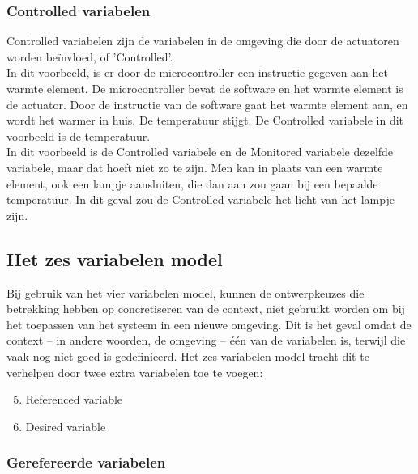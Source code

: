 \documentclass{article}
\begin{document}
			\subsubsection{Controlled variabelen}

			Controlled variabelen zijn de variabelen in de omgeving die door de actuatoren worden beïnvloed, of 'Controlled'. \\
			In dit voorbeeld, is er door de microcontroller een instructie gegeven aan het warmte element. De microcontroller bevat de software en het warmte element is de actuator. Door de instructie van de software gaat het warmte element aan, en wordt het warmer in huis. De temperatuur stijgt. De Controlled variabele in dit voorbeeld is de temperatuur. \\
			In dit voorbeeld is de Controlled variabele en de Monitored variabele dezelfde variabele, maar dat hoeft niet zo te zijn. Men kan in plaats van een warmte element, ook een lampje aansluiten, die dan aan zou gaan bij een bepaalde temperatuur. In dit geval zou de Controlled variabele het licht van het lampje zijn. \par

		\subsection{Het zes variabelen model}

		Bij gebruik van het vier variabelen model, kunnen de ontwerpkeuzes die betrekking hebben op concretiseren van de context, niet gebruikt worden om bij het toepassen van het systeem in een nieuwe omgeving. Dit is het geval omdat de context -- in andere woorden, de omgeving -- één van de variabelen is, terwijl die vaak nog niet goed is gedefinieerd. Het zes variabelen model tracht dit te verhelpen door twee extra variabelen toe te voegen: \par

		\begin{enumerate}
			\setcounter{enumi}{4}
			\item Referenced variable
			\item Desired variable
		\end{enumerate}

			\subsubsection{Gerefereerde variabelen}
			
\end{document}
